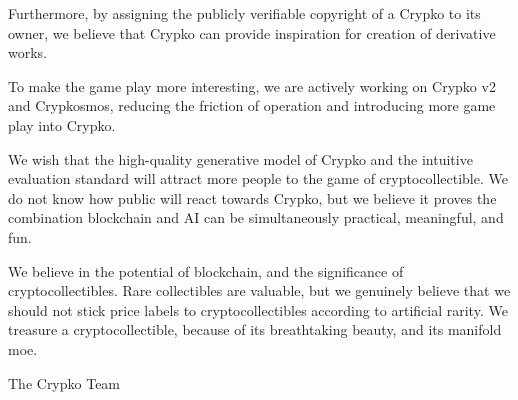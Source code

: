 \documentclass[b5paper]{article}
\begin{document}
Furthermore, by assigning the publicly verifiable copyright of a Crypko to its owner, we believe that Crypko can provide inspiration for creation of derivative works.

To make the game play more interesting, we are actively working on Crypko v2 and Crypkosmos, reducing the friction of operation and introducing more game play into Crypko.

We wish that the high-quality generative model of Crypko and the intuitive evaluation standard will attract more people to the game of cryptocollectible. We do not know how public will react towards Crypko, but we believe it proves the combination blockchain and AI can be simultaneously practical, meaningful, and fun.

We believe in the potential of blockchain, and the significance of cryptocollectibles.
Rare collectibles are valuable, but we genuinely believe that we should not stick price labels to cryptocollectibles according to artificial rarity. We treasure a cryptocollectible, because of its breathtaking beauty, and its manifold moe.

\vspace{5mm}

\begin{flushright}
 The Crypko Team
\end{flushright}



\end{document}
